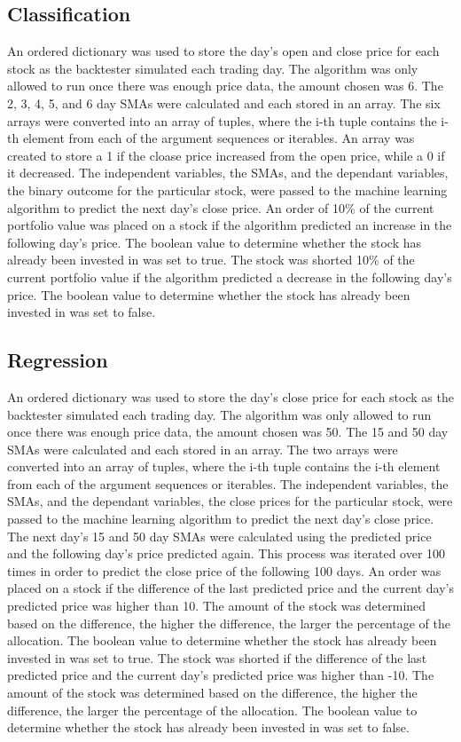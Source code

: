 \subsection{Classification}
An ordered dictionary was used to store the day's open and close price for each stock as the backtester simulated each trading day. The algorithm was only allowed to run once there was enough price data, the amount chosen was 6. The 2, 3, 4, 5, and 6 day SMAs were calculated and each stored in an array. The six arrays were converted into an array of tuples, where the i-th tuple contains the i-th element from each of the argument sequences or iterables. An array was created to store a 1 if the cloase price increased from the open price, while a 0 if it decreased. The independent variables, the SMAs, and the dependant variables, the binary outcome for the particular stock, were passed to the machine learning algorithm to predict the next day's close price. An order of 10\% of the current portfolio value was placed on a stock if the algorithm predicted an increase in the following day's price. The boolean value to determine whether the stock has already been invested in was set to true. The stock was shorted 10\% of the current portfolio value if the algorithm predicted a decrease in the following day's price. The boolean value to determine whether the stock has already been invested in was set to false.

\subsection{Regression}
An ordered dictionary was used to store the day's close price for each stock as the backtester simulated each trading day. The algorithm was only allowed to run once there was enough price data, the amount chosen was 50. The 15 and 50 day SMAs were calculated and each stored in an array. The two arrays were converted into an array of tuples, where the i-th tuple contains the i-th element from each of the argument sequences or iterables. The independent variables, the SMAs, and the dependant variables, the close prices for the particular stock, were passed to the machine learning algorithm to predict the next day's close price. The next day's 15 and 50 day SMAs were calculated using the predicted price and the following day's price predicted again. This process was iterated over 100 times in order to predict the close price of the following 100 days. An order was placed on a stock if the difference of the last predicted price and the current day's predicted price was higher than 10. The amount of the stock was determined based on the difference, the higher the difference, the larger the percentage of the allocation. The boolean value to determine whether the stock has already been invested in was set to true. The stock was shorted if the difference of the last predicted price and the current day's predicted price was higher than -10. The amount of the stock was determined based on the difference, the higher the difference, the larger the percentage of the allocation. The boolean value to determine whether the stock has already been invested in was set to false.